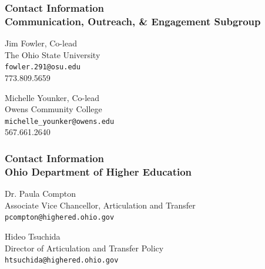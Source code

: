 \documentclass[14pt]{beamer}
\newcounter{a}
\newcounter{b}
\begin{document}
\begin{frame}
  \frametitle{Contact Information \\ Communication, Outreach, \& Engagement Subgroup}

  Jim Fowler, Co-lead \\
  The Ohio State University \\
  \texttt{fowler.291@osu.edu} \\
  773.809.5659 

  \vfill
  
    Michelle Younker, Co-lead  \\
     Owens Community College \\
     \texttt{michelle\_younker@owens.edu} \\
     567.661.2640

     \vfill
\end{frame}

\begin{frame}
  \frametitle{Contact Information \\ Ohio Department of Higher Education}


Dr. Paula Compton \\
    Associate Vice Chancellor, Articulation and Transfer \\
    \texttt{pcompton@highered.ohio.gov}

    \vfill
    
Hideo Tsuchida \\
    Director of Articulation and Transfer Policy \\
    \texttt{htsuchida@highered.ohio.gov}

    \vfill
    
\end{frame}
\end{document}
